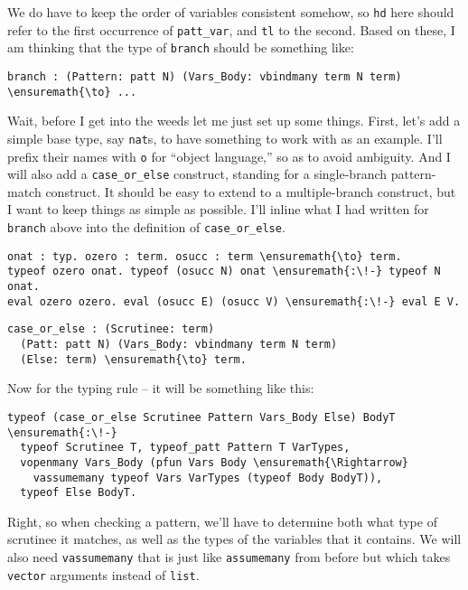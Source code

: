 We do have to keep the order of variables consistent somehow, so
\texttt{hd} here should refer to the first occurrence of
\texttt{patt\_var}, and \texttt{tl} to the second. Based on these, I am
thinking that the type of \texttt{branch} should be something like:

\begin{verbatim}
branch : (Pattern: patt N) (Vars_Body: vbindmany term N term) \ensuremath{\to} ...
\end{verbatim}

Wait, before I get into the weeds let me just set up some things. First,
let's add a simple base type, say \texttt{nat}s, to have something to
work with as an example. I'll prefix their names with \texttt{o} for
``object language,'' so as to avoid ambiguity. And I will also add a
\texttt{case\_or\_else} construct, standing for a single-branch
pattern-match construct. It should be easy to extend to a
multiple-branch construct, but I want to keep things as simple as
possible. I'll inline what I had written for \texttt{branch} above into
the definition of \texttt{case\_or\_else}.

\begin{verbatim}
onat : typ. ozero : term. osucc : term \ensuremath{\to} term.
typeof ozero onat. typeof (osucc N) onat \ensuremath{:\!-} typeof N onat.
eval ozero ozero. eval (osucc E) (osucc V) \ensuremath{:\!-} eval E V.
\end{verbatim}

\begin{verbatim}
case_or_else : (Scrutinee: term)
  (Patt: patt N) (Vars_Body: vbindmany term N term)
  (Else: term) \ensuremath{\to} term.
\end{verbatim}

Now for the typing rule -- it will be something like this:

\begin{verbatim}
typeof (case_or_else Scrutinee Pattern Vars_Body Else) BodyT \ensuremath{:\!-}
  typeof Scrutinee T, typeof_patt Pattern T VarTypes,
  vopenmany Vars_Body (pfun Vars Body \ensuremath{\Rightarrow}
    vassumemany typeof Vars VarTypes (typeof Body BodyT)),
  typeof Else BodyT.
\end{verbatim}

Right, so when checking a pattern, we'll have to determine both what
type of scrutinee it matches, as well as the types of the variables that
it contains. We will also need \texttt{vassumemany} that is just like
\texttt{assumemany} from before but which takes \texttt{vector}
arguments instead of \texttt{list}.

